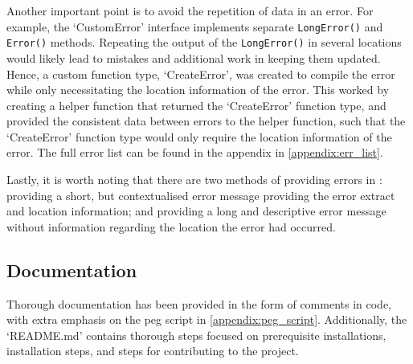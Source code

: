 Another important point is to avoid the repetition of data in an error. For example, the `CustomError' interface implements separate \verb|LongError()| and \verb|Error()| methods. Repeating the output of the \verb|LongError()| in several locations would likely lead to mistakes and additional work in keeping them updated. Hence, a custom function type, `CreateError', was created to compile the error while only necessitating the location information of the error. This worked by creating a helper function that returned the `CreateError' function type, and provided the consistent data between errors to the helper function, such that the `CreateError' function type would only require the location information of the error. The full error list can be found in the appendix in \cref{appendix:err_list}.

Lastly, it is worth noting that there are two methods of providing errors in \lintex : providing a short, but contextualised error message providing the error extract and location information; and providing a long and descriptive error message without information regarding the location the error had occurred.
\subsection{\nmu Documentation \nmu}\label{specification_design:documentation}
Thorough documentation has been provided in the form of comments in code, with extra emphasis on the \acrshort{peg} script in \cref{appendix:peg_script}. Additionally, the `README.md' contains thorough steps focused on prerequisite installations, installation steps, and steps for contributing to the project.